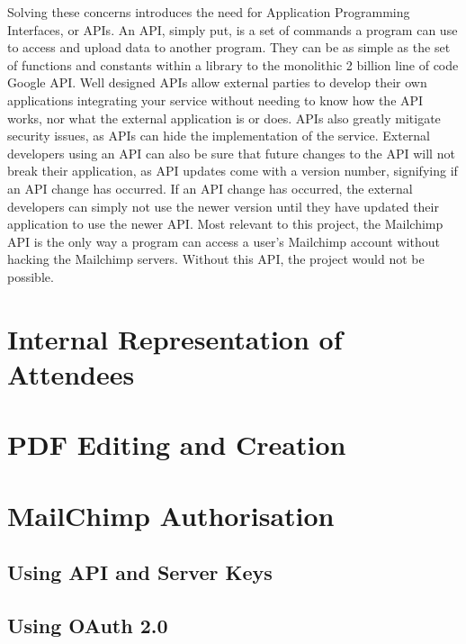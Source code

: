 \documentclass[11pt]{article}
\begin{document}
Solving these concerns introduces the need for Application Programming Interfaces, or APIs. An API, simply put, is a set of commands a program can use to access and upload data to another program. They can be as simple as the set of functions and constants within a library to the monolithic 2 billion line of code Google API. Well designed APIs allow external parties to develop their own applications integrating your service without needing to know how the API works, nor what the external application is or does. APIs also greatly mitigate security issues, as APIs can hide the implementation of the service. External developers using an API can also be sure that future changes to the API will not break their application, as API updates come with a version number, signifying if an API change has occurred. If an API change has occurred, the external developers can simply not use the newer version until they have updated their application to use the newer API. Most relevant to this project, the Mailchimp API is the only way a program can access a user's Mailchimp account without hacking the Mailchimp servers. Without this API, the project would not be possible.

\newpage

\section{Internal Representation of Attendees}



\newpage

\section{PDF Editing and Creation}



\newpage

\section{MailChimp Authorisation}

\subsection{Using API and Server Keys}




\subsection{Using OAuth 2.0}
\end{document}
